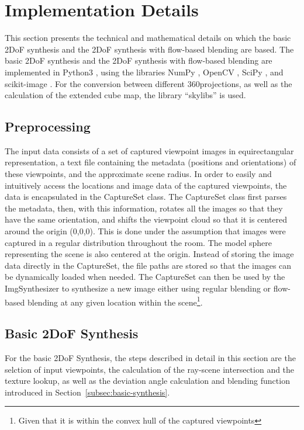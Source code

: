 \section{Implementation Details} \label{sec:impl_details}
This section presents the technical and mathematical details on which the basic 2DoF synthesis and the 2DoF synthesis with flow-based blending are based. 
The basic 2DoF synthesis and the 2DoF synthesis with flow-based blending are implemented in Python3 \cite{python}, using the libraries NumPy \cite{numpy}, OpenCV \cite{opencv}, SciPy \cite{scipy}, and scikit-image \cite{skimage}. For the conversion between different 360\degree projections, as well as the calculation of the extended cube map, the library ``skylibs'' \cite{skylibs} is used.


\subsection{Preprocessing}
The input data consists of a set of captured viewpoint images in equirectangular representation, a text file containing the metadata (positions and orientations) of these viewpoints, and the approximate scene radius. In order to easily and intuitively access the locations and image data of the captured viewpoints, the data is encapsulated in the CaptureSet class. The CaptureSet class first parses the metadata, then, with this information, rotates all the images so that they have the same orientation, and shifts the viewpoint cloud so that it is centered around the origin (0,0,0). This is done under the assumption that images were captured in a regular distribution throughout the room. The model sphere representing the scene is also centered at the origin. Instead of storing the image data directly in the CaptureSet, the file paths are stored so that the images can be dynamically loaded when needed. The CaptureSet can then be used by the ImgSynthesizer to synthesize a new image either using regular blending or flow-based blending at any given location within the scene\footnote{Given that it is within the convex hull of the captured viewpoints}.

\subsection{Basic 2DoF Synthesis}
For the basic 2DoF Synthesis, the steps described in detail in this section are the selction of input viewpoints, the calculation of the ray-scene intersection and the texture lookup, as well as the deviation angle calculation and blending function introduced in Section~\ref{subsec:basic-synthesis}.

